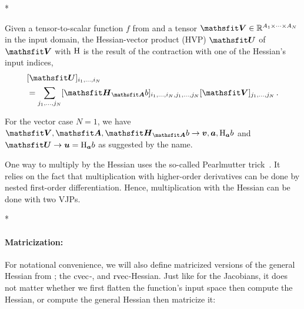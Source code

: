 \switchcolumn[1]*
\switchcolumn[0]

\begin{definition}\label{def:hvp}
  Given a tensor-to-scalar function $f$ from  and a tensor $\tV \in \sR^{A_1 \times \dots \times A_N}$ in the input domain, the Hessian-vector product (HVP) $\tU$ of $\tV$ with $\mathrm{H}$ is the result of the contraction with one of the Hessian's input indices,
  \begin{align*}
    &[\tU]_{i_1, \dots, i_N}
    \\
    &=
      \sum_{j_1, \dots, j_N}
      [\tH_{\tA}b]_{i_1, \dots, i_N, j_1, \dots, j_N} [\tV]_{j_1, \dots, j_N}\,.
  \end{align*}
\end{definition}
For the vector case $N=1$, we have $\tV, \tA, \tH_{\tA}b \to \vv, \va, \hess_{\va}b$ and $\tU \to \vu = \hess_{\va} b$ as suggested by the name.

One way to multiply by the Hessian uses the so-called Pearlmutter trick~\cite{pearlmutter1994fast}.
It relies on the fact that multiplication with higher-order derivatives can be done by nested first-order differentiation.
Hence, multiplication with the Hessian can be done with two VJPs.

\switchcolumn[1]*
\switchcolumn[0]

\paragraph{Matricization:} For notational convenience, we will also define matricized versions of the general Hessian from ; the $\operatorname{cvec}$-, and $\operatorname{rvec}$-Hessian. Just like for the Jacobians, it does not matter whether we first flatten the function's input space then compute the Hessian, or compute the general Hessian then matricize it:

